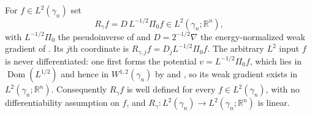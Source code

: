 \begin{definition}
For $f \in L^2(\gamma_n)$ set
\[
  R_\gamma f = D\, L^{-1/2}\Pi_0 f \in L^2(\gamma_n;\mathbb{R}^n),
\]
with $L^{-1/2}\Pi_0$ the pseudoinverse of  and
$D = 2^{-1/2}\nabla$ the energy-normalized weak gradient of .
Its $j$th coordinate is $R_{\gamma,j} f = D_j L^{-1/2}\Pi_0 f$.  The arbitrary
$L^2$ input $f$ is never differentiated: one first forms the potential
$v = L^{-1/2}\Pi_0 f$, which lies in $\operatorname{Dom}(L^{1/2})$ and hence in
$W^{1,2}(\gamma_n)$ by  and
, so its weak gradient exists in
$L^2(\gamma_n;\mathbb{R}^n)$.  Consequently $R_\gamma f$ is well defined for every
$f \in L^2(\gamma_n)$, with no differentiability assumption on $f$, and
$R_\gamma : L^2(\gamma_n) \to L^2(\gamma_n;\mathbb{R}^n)$ is linear.
\end{definition}
